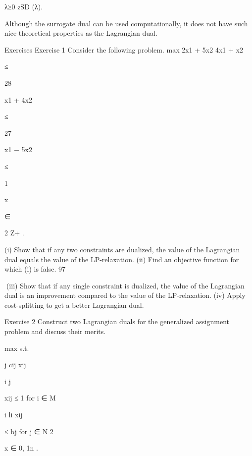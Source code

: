 λ≥0 zSD (λ).

Although the surrogate dual can be used computationally, it does not have such nice theoretical properties
as the Lagrangian dual.

Exercises
Exercise 1
Consider the following problem.
max 2x1 + 5x2
4x1 + x2

≤

28

x1 + 4x2

≤

27

x1 − 5x2

≤

1

x

∈

2
Z+
.

(i) Show that if any two constraints are dualized, the value of the Lagrangian dual equals the value of
the LP-relaxation.
(ii) Find an objective function for which (i) is false.
97

(iii) Show that if any single constraint is dualized, the value of the Lagrangian dual is an improvement
compared to the value of the LP-relaxation.
(iv) Apply cost-splitting to get a better Lagrangian dual.

Exercise 2
Construct two Lagrangian duals for the generalized assignment problem and discuss their merits.

max
s.t.

j cij xij

i
j

xij ≤ 1 for i ∈ M

i li xij

≤ bj for j ∈ N
2

x ∈ {0, 1}n .